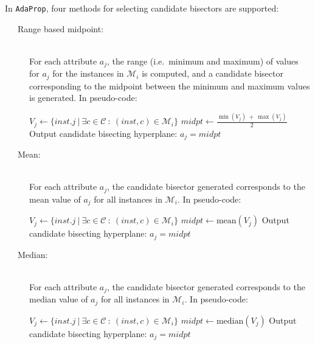 \documentclass[a4paper,12pt]{article} %
\newcommand{\AdaProp}{\texttt{AdaProp}\xspace}
\newcommand{\mcl}[1]{\mathcal{#1}}
\begin{document}
In \AdaProp, four methods for selecting candidate bisectors are supported:
\begin{description}

\item[~~~Range based midpoint:] \ \\
    For each attribute $a_j$, 
    the range (i.e.\ minimum and maximum) of values for $a_j$ 
        for the instances in $\mcl{M}_i$ is computed, 
        and a candidate bisector corresponding to the midpoint between the 
        minimum and maximum values is generated.
    In pseudo-code:
    \begin{algorithmic}
        \State $V_j \gets \{ inst.j ~|~ \exists c \in \mcl{C} ~:~ (inst,c) \in \mcl{M}_i \}$
        \State $midpt \gets \frac{\min(V_j) ~+~ \max(V_j)}{2}$
        \State Output candidate bisecting hyperplane: $a_j = midpt $
    \EndFor
    \end{algorithmic}
    
\item[~~~Mean:]  \ \\
    For each attribute $a_j$, 
        the candidate bisector generated corresponds to 
        the mean value of $a_j$ 
        for all instances in $\mcl{M}_i$.
    In pseudo-code:
    \begin{algorithmic}
        \State $V_j \gets \{ inst.j ~|~ \exists c \in \mcl{C} ~:~ (inst,c) \in \mcl{M}_i \}$
        \State $midpt \gets \textrm{mean}(V_j)$
        \State Output candidate bisecting hyperplane: $a_j = midpt $
    \EndFor
    \end{algorithmic}        
        

\item[~~~Median:]  \ \\
    For each attribute $a_j$, 
        the candidate bisector generated corresponds to 
        the median value of $a_j$ 
        for all instances in $\mcl{M}_i$.
    In pseudo-code:
    \begin{algorithmic}
        \State $V_j \gets \{ inst.j ~|~ \exists c \in \mcl{C} ~:~ (inst,c) \in \mcl{M}_i \}$
        \State $midpt \gets \textrm{median}(V_j)$
        \State Output candidate bisecting hyperplane: $a_j = midpt $
    \EndFor
    \end{algorithmic}  
    

\end{description}
\end{document}
